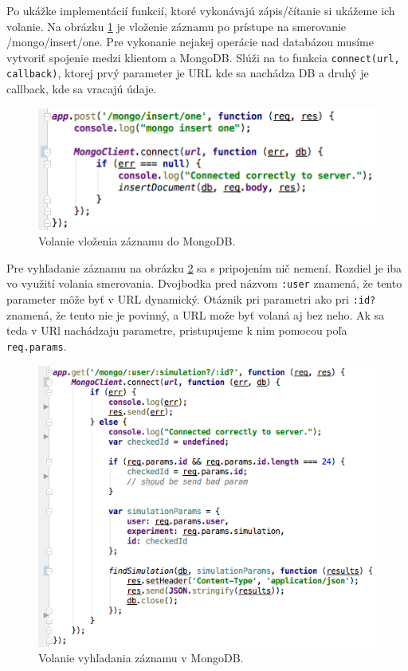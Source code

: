 Po ukážke implementácií funkcií, ktoré vykonávajú zápis/čítanie si ukážeme ich volanie. Na obrázku \ref{img-express-mongodb-insert2} je vloženie záznamu po prístupe na smerovanie /mongo/insert/one.
Pre vykonanie nejakej operácie nad databázou musíme vytvoriť spojenie medzi klientom a MongoDB. Slúži na to funkcia \verb|connect(url, callback)|, ktorej prvý parameter je URL kde sa nachádza DB a druhý je callback, kde sa vracajú údaje.

\begin{figure}[H]
  \centering
  \includegraphics[scale=0.7]{img/code/express-mongo-insert2.png}
  \caption{Volanie vloženia záznamu do MongoDB.}
  \label{img-express-mongodb-insert2}
\end{figure}

Pre vyhľadanie záznamu na obrázku \ref{img-express-mongodb-find2} sa s pripojením nič nemení.
Rozdiel je iba vo využití volania smerovania. Dvojbodka pred názvom \verb|:user| znamená, že tento parameter môže byť v URL dynamický. Otáznik pri parametri ako pri \verb|:id?| znamená, že tento nie je povinný, a URL može byť volaná aj bez neho. Ak sa teda v URl nachádzaju parametre, pristupujeme k nim pomocou poľa \verb|req.params|.

\begin{figure}[H]
  \centering
  \includegraphics[scale=0.7]{img/code/express-mongodb-find2.png}
  \caption{Volanie vyhľadania záznamu v MongoDB.}
  \label{img-express-mongodb-find2}
\end{figure}
 

